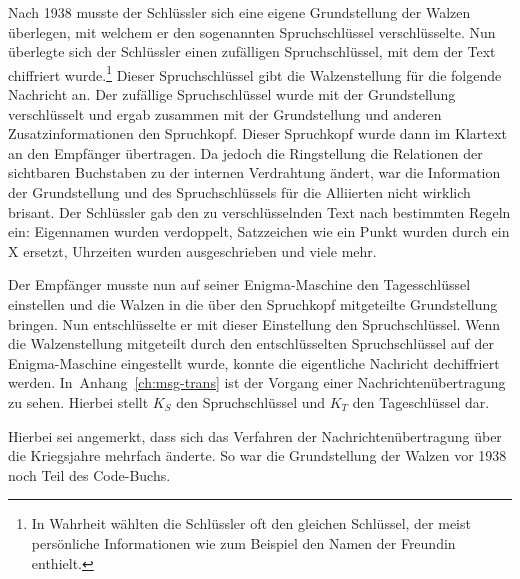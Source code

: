 Nach 1938 musste der Schlüssler sich eine eigene Grundstellung der Walzen überlegen, mit welchem er den sogenannten Spruchschlüssel verschlüsselte.
Nun überlegte sich der Schlüssler einen \glqq zufälligen\grqq{} Spruchschlüssel, mit dem der Text chiffriert wurde.\footnote{In Wahrheit wählten die Schlüssler oft den gleichen Schlüssel, der meist persönliche Informationen wie zum Beispiel den Namen der Freundin enthielt.}
Dieser Spruchschlüssel gibt die Walzenstellung für die folgende Nachricht an.
Der \glqq zufällige\grqq{} Spruchschlüssel wurde mit der Grundstellung verschlüsselt und ergab zusammen mit der Grundstellung und anderen Zusatzinformationen den \glqq Spruchkopf\grqq.
Dieser Spruchkopf wurde dann im Klartext an den Empfänger übertragen.  
Da jedoch die Ringstellung die Relationen der sichtbaren Buchstaben zu der internen Verdrahtung ändert, war die Information der Grundstellung und des Spruchschlüssels für die Alliierten nicht wirklich brisant.
Der Schlüssler gab den zu verschlüsselnden Text nach bestimmten Regeln ein\autocite{schluesselm1940}: Eigennamen wurden verdoppelt, Satzzeichen wie ein Punkt wurden durch ein X ersetzt, Uhrzeiten wurden ausgeschrieben und viele mehr.

Der Empfänger musste nun auf seiner Enigma-Maschine den Tagesschlüssel einstellen und die Walzen in die über den Spruchkopf mitgeteilte Grundstellung bringen.
Nun entschlüsselte er mit dieser Einstellung den Spruchschlüssel.
Wenn die Walzenstellung mitgeteilt durch den entschlüsselten Spruchschlüssel auf der Enigma-Maschine eingestellt wurde, konnte die eigentliche Nachricht dechiffriert werden.
In~Anhang~\ref{ch:msg-trans} ist der Vorgang einer Nachrichtenübertragung zu sehen.
Hierbei stellt $K_S$ den Spruchschlüssel und $K_T$ den Tageschlüssel dar.

Hierbei sei angemerkt, dass sich das Verfahren der Nachrichtenübertragung über die Kriegsjahre mehrfach änderte.
So war die Grundstellung der Walzen vor 1938 noch Teil des Code-Buchs.

